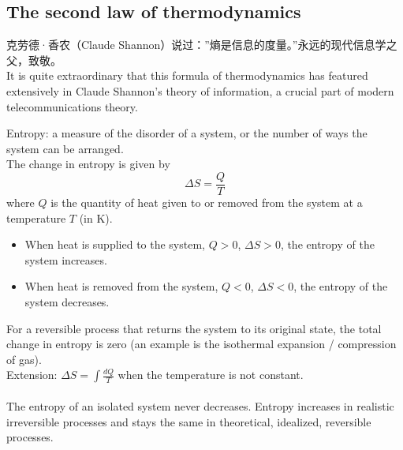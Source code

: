 \subsection{The second law of thermodynamics}
克劳德·香农（Claude Shannon）说过：”熵是信息的度量。”永远的现代信息学之父，致敬。\\
It is quite extraordinary that this formula of thermodynamics has featured extensively in Claude Shannon's theory of information, a crucial part of modern telecommunications theory.

Entropy: a measure of the disorder of a system, or the number of ways the system can be arranged.\\
The change in entropy is given by
\[\Delta S = \dfrac{Q}{T}\]
where $Q$ is the quantity of heat given to or removed from the system at a temperature $T$ (in K).\\
\begin{itemize}
  \item When heat is supplied to the system, $Q>0$, $\Delta S>0$, the entropy of the system increases.
  \item When heat is removed from the system, $Q<0$, $\Delta S<0$, the entropy of the system decreases.
\end{itemize} 
For a reversible process that returns the system to its original state, the total change in entropy is zero (an example is the isothermal expansion / compression of gas).\\
Extension: \(\displaystyle \Delta S = \int \frac{dQ}{T}\) when the temperature is not constant.\\\\
The entropy of an isolated system never decreases. Entropy increases in realistic irreversible processes and stays the same in theoretical, idealized, reversible processes.
